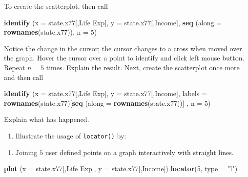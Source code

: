 \documentclass[
]{book}
\newenvironment{Shaded}{\begin{snugshade}}{\end{snugshade}}
\newcommand{\AttributeTok}[1]{\textcolor[rgb]{0.13,0.29,0.53}{#1}}
\newcommand{\DecValTok}[1]{\textcolor[rgb]{0.00,0.00,0.81}{#1}}
\newcommand{\FunctionTok}[1]{\textcolor[rgb]{0.13,0.29,0.53}{\textbf{#1}}}
\newcommand{\NormalTok}[1]{#1}
\newcommand{\StringTok}[1]{\textcolor[rgb]{0.31,0.60,0.02}{#1}}
\providecommand{\tightlist}{%
  \setlength{\itemsep}{0pt}\setlength{\parskip}{0pt}}
\begin{document}
To create the scatterplot, then call

\begin{Shaded}
\begin{Highlighting}[]
\FunctionTok{identify}\NormalTok{ (}\AttributeTok{x =}\NormalTok{ state.x77[,}\StringTok{\textquotesingle{}Life Exp\textquotesingle{}}\NormalTok{], }\AttributeTok{y =}\NormalTok{ state.x77[,}\StringTok{\textquotesingle{}Income\textquotesingle{}}\NormalTok{], }
          \FunctionTok{seq}\NormalTok{ (}\AttributeTok{along =} \FunctionTok{rownames}\NormalTok{(state.x77)), }\AttributeTok{n =} \DecValTok{5}\NormalTok{)}
\end{Highlighting}
\end{Shaded}

Notice the change in the cursor; the cursor changes to a cross when moved over the graph. Hover the cursor over a point to identify and click left mouse button. Repeat \(n = 5\) times. Explain the result. Next, create the scatterplot once more and then call

\begin{Shaded}
\begin{Highlighting}[]
\FunctionTok{identify}\NormalTok{ (}\AttributeTok{x =}\NormalTok{ state.x77[,}\StringTok{\textquotesingle{}Life Exp\textquotesingle{}}\NormalTok{],  }\AttributeTok{y =}\NormalTok{ state.x77[,}\StringTok{\textquotesingle{}Income\textquotesingle{}}\NormalTok{], }
          \AttributeTok{labels =} \FunctionTok{rownames}\NormalTok{(state.x77)[}\FunctionTok{seq}\NormalTok{ (}\AttributeTok{along =} 
                                              \FunctionTok{rownames}\NormalTok{(state.x77))] , }\AttributeTok{n =} \DecValTok{5}\NormalTok{) }
\end{Highlighting}
\end{Shaded}

Explain what has happened.

\begin{enumerate}
\def\labelenumi{(\alph{enumi})}
\setcounter{enumi}{2}
\tightlist
\item
  Illustrate the usage of \texttt{locator()} by:
\end{enumerate}

\begin{enumerate}
\def\labelenumi{(\roman{enumi})}
\tightlist
\item
  Joining \(5\) user defined points on a graph interactively with straight lines.
\end{enumerate}

\begin{Shaded}
\begin{Highlighting}[]
\FunctionTok{plot}\NormalTok{ (}\AttributeTok{x =}\NormalTok{ state.x77[,}\StringTok{\textquotesingle{}Life Exp\textquotesingle{}}\NormalTok{], }\AttributeTok{y =}\NormalTok{ state.x77[,}\StringTok{\textquotesingle{}Income\textquotesingle{}}\NormalTok{])}
\FunctionTok{locator}\NormalTok{(}\DecValTok{5}\NormalTok{, }\AttributeTok{type =} \StringTok{"l"}\NormalTok{) }
\end{Highlighting}
\end{Shaded}
\end{document}
